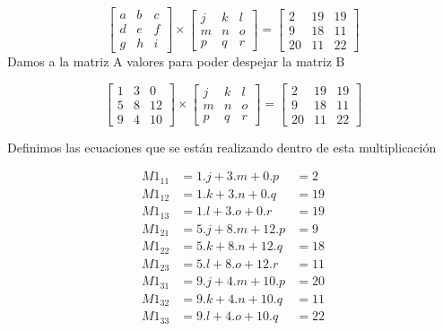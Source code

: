 \documentclass[11pt]{article}
\begin{document}
\[
\begin{bmatrix}
a & b & c \\
d & e & f \\
g & h & i
\end{bmatrix}
\times
\begin{bmatrix}
j & k & l \\
m & n & o \\
p & q & r
\end{bmatrix}
=
\begin{bmatrix}
2 & 19 & 19 \\
9 & 18 & 11 \\
20 & 11 & 22
\end{bmatrix}
\]
Damos a la matriz A valores para poder despejar la matriz B

\[
\begin{bmatrix}
1 & 3 & 0 \\
5 & 8 & 12 \\
9 & 4 & 10
\end{bmatrix}
\times
\begin{bmatrix}
j & k & l \\
m & n & o \\
p & q & r
\end{bmatrix}
=
\begin{bmatrix}
2 & 19 & 19 \\
9 & 18 & 11 \\
20 & 11 & 22
\end{bmatrix}
\]

Definimos las ecuaciones que se están realizando dentro de esta multiplicación

\begin{align*}
M1_{11}&=1.j + 3.m + 0.p &= 2\\
M1_{12}&=1.k + 3.n + 0.q &= 19\\
M1_{13}&=1.l + 3.o + 0.r &= 19\\
M1_{21}&=5.j + 8.m + 12.p &= 9\\
M1_{22}&=5.k + 8.n + 12.q &= 18\\
M1_{23}&=5.l + 8.o + 12.r &= 11\\
M1_{31}&=9.j + 4.m + 10.p &= 20\\
M1_{32}&=9.k + 4.n + 10.q &= 11\\
M1_{33}&=9.l + 4.o + 10.q &= 22
\end{align*}
\newpage
\end{document}
